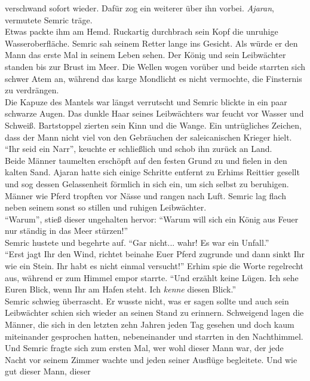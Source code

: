 verschwand sofort wieder. Dafür zog ein weiterer über ihn vorbei. \textit{Ajaran}, vermutete Semric 
träge. \\
Etwas packte ihm am Hemd. Ruckartig durchbrach sein Kopf die unruhige Wasseroberfläche. Semric sah 
seinem Retter lange ins Gesicht. Als würde er den Mann das erste Mal in seinem Leben sehen. Der 
König und sein Leibwächter standen bis zur Brust im Meer. Die Wellen wogen vorüber und beide 
starrten sich schwer Atem an, während das karge Mondlicht es nicht vermochte, die Finsternis zu 
verdrängen. \\
Die Kapuze des Mantels war längst verrutscht und Semric blickte in ein paar schwarze Augen. Das 
dunkle Haar seines Leibwächters war feucht vor Wasser und Schweiß. Bartstoppel zierten sein Kinn 
und die Wange. Ein untrügliches Zeichen, dass der Mann nicht viel von den Gebräuchen der 
saleicanischen Krieger hielt. \\
``Ihr seid ein Narr'', keuchte er schließlich und schob ihn zurück an Land. \\
Beide Männer taumelten erschöpft auf den festen Grund zu und fielen in den kalten Sand. Ajaran 
hatte sich einige Schritte entfernt zu Erhims Reittier gesellt und sog dessen Gelassenheit förmlich 
in sich ein, um sich selbst zu beruhigen. Männer wie Pferd tropften vor Nässe und rangen nach Luft. 
Semric lag flach neben seinem sonst so stillen und ruhigen Leibwächter. \\
``Warum'', stieß dieser ungehalten hervor: ``Warum will sich ein König aus Feuer nur ständig in das 
Meer stürzen!''\\
Semric hustete und begehrte auf. ``Gar nicht... wahr! Es war ein Unfall.''\\
``Erst jagt Ihr den Wind, richtet beinahe Euer Pferd zugrunde und dann sinkt Ihr wie ein Stein. Ihr 
habt es nicht einmal versucht!'' Erhim spie die Worte regelrecht aus, während er zum Himmel empor 
starrte. ``Und erzählt keine Lügen. Ich sehe Euren Blick, wenn Ihr am Hafen steht. Ich \emph{kenne} 
diesen Blick.''\\
Semric schwieg überrascht. Er wusste nicht, was er sagen sollte und auch sein Leibwächter schien 
sich wieder an seinen Stand zu erinnern. Schweigend lagen die Männer, die sich in den letzten zehn 
Jahren jeden Tag gesehen und doch kaum miteinander gesprochen hatten, nebeneinander und starrten in 
den Nachthimmel. Und Semric fragte sich zum ersten Mal, wer wohl dieser Mann war, der jede Nacht 
vor seinem Zimmer wachte und jeden seiner Ausflüge begleitete. Und wie gut dieser Mann, dieser 
